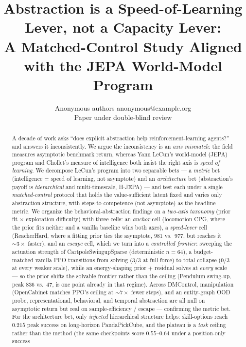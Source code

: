 \documentclass{article}
\title{Abstraction is a Speed-of-Learning Lever, not a Capacity Lever:\\
A Matched-Control Study Aligned with the JEPA World-Model Program}
\author{\name Anonymous authors \email anonymous@example.org \\
        \addr Paper under double-blind review}
\begin{document}
\maketitle

\begin{abstract}
A decade of work asks ``does explicit abstraction help reinforcement-learning
agents?'' and answers it inconsistently. We argue the inconsistency is an
\emph{axis mismatch}: the field measures asymptotic benchmark return, whereas
Yann LeCun's world-model (JEPA) program and Chollet's measure of intelligence
both insist the right axis is \emph{speed of learning}. We decompose LeCun's
program into two separable bets --- a \emph{metric} bet (intelligence = speed of
learning, not asymptote) and an \emph{architecture} bet (abstraction's payoff is
\emph{hierarchical} and multi-timescale, H-JEPA) --- and test each under a single
\emph{matched-control} protocol that holds the value-sufficient latent fixed and
varies only abstraction structure, with steps-to-competence (not asymptote) as
the headline metric. We organize the behavioral-abstraction findings on a
\emph{two-axis taxonomy} (prior fit $\times$ exploration difficulty) with three
cells: an \emph{anchor} cell (locomotion CPG, where the prior fits neither and a
vanilla baseline wins both axes), a \emph{speed-lever} cell (ReacherHard, where a
fitting prior ties the asymptote, $981$ vs.\ $977$, but reaches it ${\sim}3\times$
faster), and an \emph{escape} cell, which we turn into a \emph{controlled
frontier}: sweeping the actuation strength of CartpoleSwingupSparse (deterministic
$n=64$), a budget-matched vanilla PPO transitions from solving ($3/3$ at full
force) to total collapse ($0/3$ at every weaker scale), while an energy-shaping
prior $+$ residual solves at \emph{every} scale --- so the prior shifts the
solvable frontier rather than the ceiling (Pendulum swing-up, peak $836$ vs.\
$47$, is one point already in that regime). Across DMControl, manipulation
(OpenCabinet matches PPO's ceiling at ${\sim}7\times$ fewer steps), and an
entity-graph OOD probe, representational, behavioral, and temporal abstraction are
all null on asymptotic return but real on sample-efficiency / escape ---
confirming the metric bet. For the architecture bet, only \emph{injected}
hierarchical structure helps: skill-options reach $0.215$ peak success on
long-horizon PandaPickCube, and the plateau is a \emph{task} ceiling rather than
the method (the same checkpoints score $0.55$--$0.64$ under a position-only success

\end{abstract}
\end{document}
